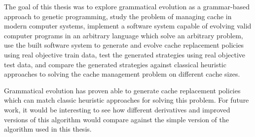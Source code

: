 The goal of this thesis was to explore grammatical evolution as a grammar-based approach to genetic programming, study the problem of managing cache in modern computer systems, implement a software system capable of evolving valid computer programs in an arbitrary language which solve an arbitrary problem, use the built software system to generate and evolve cache replacement policies using real objective train data, test the generated strategies using real objective test data, and compare the generated strategies against classical heuristic approaches to solving the cache management problem on different cache sizes.

Grammatical evolution has proven able to generate cache replacement policies which can match classic heuristic approaches for solving this problem. For future work, it would be interesting to see how different derivatives and improved versions of this algorithm would compare against the simple version of the algorithm used in this thesis.